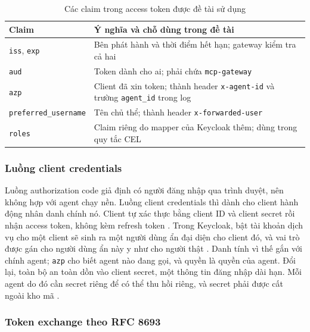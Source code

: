 \begin{table}[H]\centering\caption{Các claim trong access token được đề tài sử dụng}\label{tab:ch3-claims}
{\singlespacing\renewcommand{\arraystretch}{1.2}\small
\begin{tabularx}{\textwidth}{|p{3.3cm}|X|}\hline
\textbf{Claim} & \textbf{Ý nghĩa và chỗ dùng trong đề tài} \\ \hline
\texttt{iss}, \texttt{exp} & Bên phát hành và thời điểm hết hạn; gateway kiểm tra cả hai \\ \hline
\texttt{aud} & Token dành cho ai; phải chứa \texttt{mcp-gateway} \\ \hline
\texttt{azp} & Client đã xin token; thành header \texttt{x-agent-id} và trường \texttt{agent\_id} trong log \\ \hline
\texttt{preferred\_\allowbreak username} & Tên chủ thể; thành header \texttt{x-forwarded-user} \\ \hline
\texttt{roles} & Claim riêng do mapper của Keycloak thêm; dùng trong quy tắc CEL \\ \hline
\end{tabularx}}\end{table}

\subsubsection{Luồng client credentials}

Luồng authorization code giả định có người đăng nhập qua trình duyệt, nên không hợp với agent chạy nền. Luồng client credentials thì dành cho client hành động nhân danh chính nó. Client tự xác thực bằng client ID và client secret rồi nhận access token, không kèm refresh token \parencite{rfc6749}. Trong Keycloak, bật tài khoản dịch vụ cho một client sẽ sinh ra một người dùng ẩn đại diện cho client đó, và vai trò được gán cho người dùng ẩn này y như cho người thật \parencite{keycloak}. Danh tính vì thế gắn với chính agent; \texttt{azp} cho biết agent nào đang gọi, và quyền là quyền của agent. Đổi lại, toàn bộ an toàn dồn vào client secret, một thông tin đăng nhập dài hạn. Mỗi agent do đó cần secret riêng để có thể thu hồi riêng, và secret phải được cất ngoài kho mã \parencite{k8s_secret}.

\subsubsection{Token exchange theo RFC 8693}

